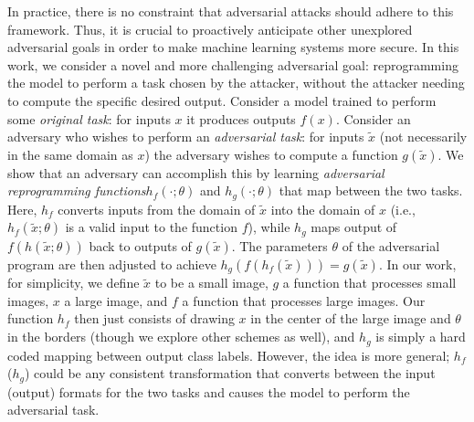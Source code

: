 \documentclass{article}
\begin{document}
 
In practice, there is no constraint that adversarial attacks should adhere to this framework. Thus, it is crucial to proactively anticipate other unexplored adversarial goals in order to make machine learning systems more secure. 
In this work, we consider a novel and more challenging adversarial goal:
reprogramming the model to perform a task chosen by the attacker,
without the attacker needing to compute the specific desired output.
Consider a model trained to perform some {\em original task}:
for inputs $x$ it produces outputs $f(x)$.
Consider an adversary who wishes to perform an {\em adversarial task}:
for inputs $\tilde{x}$ (not necessarily in the same domain as $x$)
the adversary wishes to compute a function $g(\tilde{x})$.
We show that an adversary can accomplish this by learning 
{\em adversarial reprogramming functions}$h_f(\cdot ; \theta)$ and $h_g(\cdot ; \theta)$ that map 
between the two tasks.
Here, $h_f$ converts 
inputs from the domain of $\tilde{x}$ 
into the domain of $x$ 
(i.e.,
$h_f(\tilde{x}; \theta)$ is a valid input to the function $f$), 
while $h_g$ maps output of $f(h(\tilde{x}; \theta))$ back to outputs of $g(\tilde{x})$. 
The parameters $\theta$ of the adversarial program are then adjusted to achieve
$h_g\left(
	f\left(
		h_f\left(\tilde{x}\right)
	\right)
\right) = g\left(
	\tilde{x}
\right)$.
In our work, for simplicity, 
we define $\tilde{x}$ to be a small image,
$g$ a function that processes small images,
$x$ a large image,
and $f$ a function that processes large images.
Our function $h_f$ then just consists of drawing $x$ in the center
of the large image and $\theta$ in the borders (though we explore other schemes as well), and $h_g$ is simply a hard coded mapping between output class labels. 
However, the idea is more general; $h_f$ ($h_g$) could be any consistent
transformation that converts between the input (output) formats for the two tasks
and causes the model to perform the adversarial task.
\end{document}
